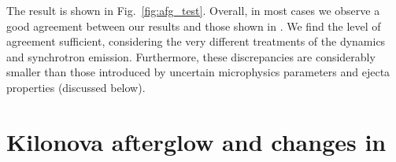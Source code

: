 The result is shown in Fig.~\ref{fig:afg_test}. Overall, in most cases we observe 
a good agreement between our results and those shown in \citet{Radice:2018pdn}. 
%
We find the level of agreement sufficient, considering the very different treatments 
of the \blast{} dynamics and synchrotron emission. Furthermore, these discrepancies 
are considerably smaller than those introduced by uncertain microphysics parameters 
and ejecta properties (discussed below).




\section{Kilonova afterglow and changes in \GRB{}} \label{sec:afterglow:results}





